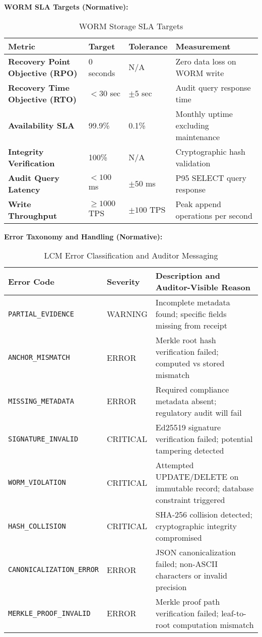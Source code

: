 \documentclass[12pt,a4paper]{article}
\begin{document}
\begin{technicalbox}
\textbf{WORM SLA Targets (Normative):}
\begin{table}[H]
\centering
\begin{tabular}{p{4cm}p{2cm}p{2cm}p{4cm}}
\toprule
\textbf{Metric} & \textbf{Target} & \textbf{Tolerance} & \textbf{Measurement} \\
\midrule
\textbf{Recovery Point Objective (RPO)} & 0 seconds & N/A & Zero data loss on WORM write \\
\textbf{Recovery Time Objective (RTO)} & $< 30$ sec & $\pm 5$ sec & Audit query response time \\
\textbf{Availability SLA} & 99.9\% & 0.1\% & Monthly uptime excluding maintenance \\
\textbf{Integrity Verification} & 100\% & N/A & Cryptographic hash validation \\
\textbf{Audit Query Latency} & $< 100$ ms & $\pm 50$ ms & P95 SELECT query response \\
\textbf{Write Throughput} & $\geq 1000$ TPS & $\pm 100$ TPS & Peak append operations per second \\
\bottomrule
\end{tabular}
\caption{WORM Storage SLA Targets}
\label{tab:worm_sla}
\end{table}

\textbf{Error Taxonomy and Handling (Normative):}
\begin{table}[H]
\centering
\begin{tabular}{p{3cm}p{2cm}p{7cm}}
\toprule
\textbf{Error Code} & \textbf{Severity} & \textbf{Description and Auditor-Visible Reason} \\
\midrule
\texttt{PARTIAL\_EVIDENCE} & WARNING & Incomplete metadata found; specific fields missing from receipt \\
\texttt{ANCHOR\_MISMATCH} & ERROR & Merkle root hash verification failed; computed vs stored mismatch \\
\texttt{MISSING\_METADATA} & ERROR & Required compliance metadata absent; regulatory audit will fail \\
\texttt{SIGNATURE\_INVALID} & CRITICAL & Ed25519 signature verification failed; potential tampering detected \\
\texttt{WORM\_VIOLATION} & CRITICAL & Attempted UPDATE/DELETE on immutable record; database constraint triggered \\
\texttt{HASH\_COLLISION} & CRITICAL & SHA-256 collision detected; cryptographic integrity compromised \\
\texttt{CANONICALIZATION\_ERROR} & ERROR & JSON canonicalization failed; non-ASCII characters or invalid precision \\
\texttt{MERKLE\_PROOF\_INVALID} & ERROR & Merkle proof path verification failed; leaf-to-root computation mismatch \\
\bottomrule
\end{tabular}
\caption{LCM Error Classification and Auditor Messaging}
\label{tab:error_taxonomy}
\end{table}


\end{technicalbox}
\end{document}

